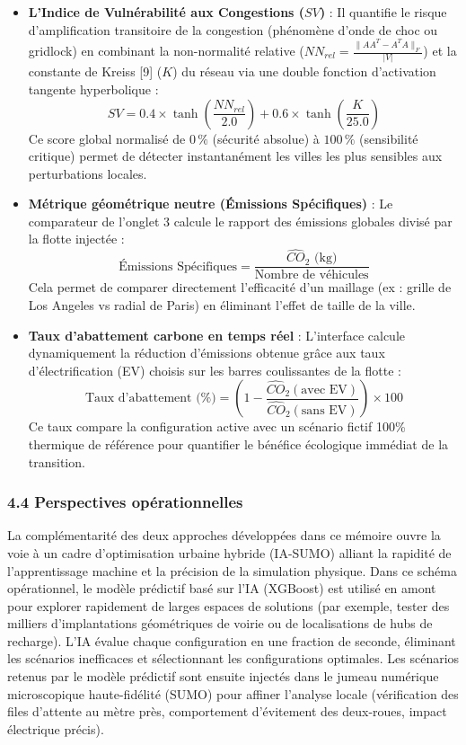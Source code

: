 \documentclass[10pt, a4paper]{article}
\begin{document}
\begin{itemize}
\item
  \textbf{L'Indice de Vulnérabilité aux Congestions (\(SV\))} : Il
  quantifie le risque d'amplification transitoire de la congestion
  (phénomène d'onde de choc ou gridlock) en combinant la non-normalité
  relative (\(NN_{rel} = \frac{\|AA^T - A^TA\|_F}{|V|}\)) et la
  constante de Kreiss {[}9{]} (\(K\)) du réseau via une double fonction
  d'activation tangente hyperbolique :
  \[SV = 0.4 \times \tanh\left(\frac{NN_{rel}}{2.0}\right) + 0.6 \times \tanh\left(\frac{K}{25.0}\right)\]
  Ce score global normalisé de \(0\,\%\) (sécurité absolue) à
  \(100\,\%\) (sensibilité critique) permet de détecter instantanément
  les villes les plus sensibles aux perturbations locales.
\item
  \textbf{Métrique géométrique neutre (Émissions Spécifiques)} : Le
  comparateur de l'onglet 3 calcule le rapport des émissions globales
  divisé par la flotte injectée :
  \[\text{Émissions Spécifiques} = \frac{\widehat{CO}_2 \text{ (kg)}}{\text{Nombre de véhicules}}\]
  Cela permet de comparer directement l'efficacité d'un maillage (ex :
  grille de Los Angeles vs radial de Paris) en éliminant l'effet de
  taille de la ville.
\item
  \textbf{Taux d'abattement carbone en temps réel} : L'interface calcule
  dynamiquement la réduction d'émissions obtenue grâce aux taux
  d'électrification (EV) choisis sur les barres coulissantes de la
  flotte :
  \[\text{Taux d'abattement (\%)} = \left( 1 - \frac{\widehat{CO}_2(\text{avec EV})}{\widehat{CO}_2(\text{sans EV})} \right) \times 100\]
  Ce taux compare la configuration active avec un scénario fictif 100\%
  thermique de référence pour quantifier le bénéfice écologique immédiat
  de la transition.
\end{itemize}

\subsubsection{4.4 Perspectives
opérationnelles}\label{perspectives-opuxe9rationnelles}

La complémentarité des deux approches développées dans ce mémoire ouvre
la voie à un cadre d'optimisation urbaine hybride (IA-SUMO) alliant la
rapidité de l'apprentissage machine et la précision de la simulation
physique. Dans ce schéma opérationnel, le modèle prédictif basé sur l'IA
(XGBoost) est utilisé en amont pour explorer rapidement de larges
espaces de solutions (par exemple, tester des milliers d'implantations
géométriques de voirie ou de localisations de hubs de recharge). L'IA
évalue chaque configuration en une fraction de seconde, éliminant les
scénarios inefficaces et sélectionnant les configurations optimales. Les
scénarios retenus par le modèle prédictif sont ensuite injectés dans le
jumeau numérique microscopique haute-fidélité (SUMO) pour affiner
l'analyse locale (vérification des files d'attente au mètre près,
comportement d'évitement des deux-roues, impact électrique précis).
\end{document}
